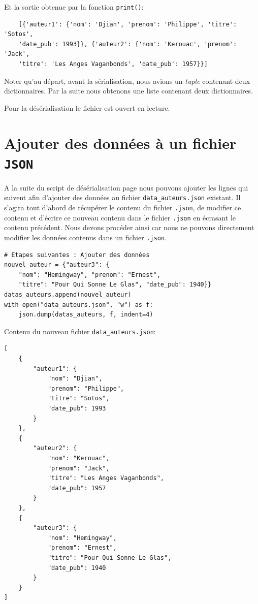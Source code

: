 \documentclass[a4paper,12pt]{book}
\begin{document}
Et la sortie obtenue par la fonction \texttt{print()}:
\begin{verbatim}
    [{'auteur1': {'nom': 'Djian', 'prenom': 'Philippe', 'titre': 'Sotos', 
    'date_pub': 1993}}, {'auteur2': {'nom': 'Kerouac', 'prenom': 'Jack', 
    'titre': 'Les Anges Vaganbonds', 'date_pub': 1957}}]
\end{verbatim}
\medskip

Noter qu'au départ, avant la sérialisation, nous avions un \textit{tuple} contenant deux dictionnaires. Par la suite nous obtenons une liste contenant deux dictionnaires.
\medskip

Pour la désérialisation le fichier est ouvert en lecture.
\medskip

\section{Ajouter des données à un fichier \texttt{JSON}}
A la suite du script de désérialisation page \pageref{deserialisationJSON} nous pouvons ajouter les lignes qui suivent afin d'ajouter des données au fichier \texttt{data\_auteurs.json} existant. Il s'agira tout d'abord de récupérer  le contenu du fichier \texttt{.json}, de modifier ce contenu et d'écrire ce nouveau contenu dans le fichier \texttt{.json} en écrasant le contenu précédent. Nous devons procéder ainsi car nous ne pouvons directement modifier les données contenus dans un fichier \texttt{.json}.
\begin{lstlisting}[caption=Ajouter des données à un fichier \texttt{.json} existant.]
# Etapes suivantes : Ajouter des données
nouvel_auteur = {"auteur3": {
    "nom": "Hemingway", "prenom": "Ernest",
    "titre": "Pour Qui Sonne Le Glas", "date_pub": 1940}}
datas_auteurs.append(nouvel_auteur)
with open("data_auteurs.json", "w") as f:
    json.dump(datas_auteurs, f, indent=4)
\end{lstlisting}
\medskip

Contenu du nouveau fichier \texttt{data\_auteurs.json}:
\begin{lstlisting}[caption=Contenu du fichier \texttt{data\_auteurs.json} augmenté des nouvelles données.]
[
    {
        "auteur1": {
            "nom": "Djian",
            "prenom": "Philippe",
            "titre": "Sotos",
            "date_pub": 1993
        }
    },
    {
        "auteur2": {
            "nom": "Kerouac",
            "prenom": "Jack",
            "titre": "Les Anges Vaganbonds",
            "date_pub": 1957
        }
    },
    {
        "auteur3": {
            "nom": "Hemingway",
            "prenom": "Ernest",
            "titre": "Pour Qui Sonne Le Glas",
            "date_pub": 1940
        }
    }
]
\end{lstlisting}
\medskip
\end{document}
